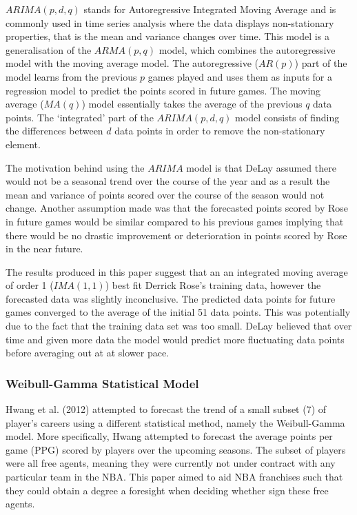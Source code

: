 \documentclass[a4paper,11pt,twoside]{article}
\begin{document}
$ARIMA(p,d,q)$ stands for Autoregressive Integrated Moving Average and is commonly used in time series analysis where the data displays non-stationary properties, that is the mean and variance changes over time. This model is a generalisation of the $ARMA(p,q)$ model, which combines the autoregressive model with the moving average model. The autoregressive ($AR(p)$) part of the model learns from the previous $p$ games played and uses them as inputs for a regression model to predict the points scored in future games. The moving average ($MA(q)$) model essentially takes the average of the previous $q$ data points. The `integrated' part of the $ARIMA(p,d,q)$ model consists of finding the differences between $d$ data points in order to remove the non-stationary element.

The motivation behind using the $ARIMA$ model is that DeLay assumed there would not be a seasonal trend over the course of the year and as a result the mean and variance of points scored over the course of the season would not change. Another assumption made was that the forecasted points scored by Rose in future games would be similar compared to his previous games implying that there would be no drastic improvement or deterioration in points scored by Rose in the near future.

The results produced in this paper suggest that an an integrated moving average of order 1 ($IMA(1,1)$) best fit Derrick Rose's training data, however the forecasted data was slightly inconclusive. The predicted data points for future games converged to the average of the initial 51 data points. This was potentially due to the fact that the training data set was too small. DeLay believed that over time and given more data the model would predict more fluctuating data points before averaging out at at slower pace. 


\subsubsection{Weibull-Gamma Statistical Model}

Hwang et al. (2012) attempted to forecast the trend of a small subset (7) of player's careers using a different statistical method, namely the Weibull-Gamma model. More specifically, Hwang attempted to forecast the average points per game (PPG) scored by players over the upcoming seasons. The subset of players were all free agents, meaning they were currently not under contract with any particular team in the NBA. This paper aimed to aid NBA franchises such that they could obtain a degree a foresight when deciding whether sign these free agents.
\end{document}
